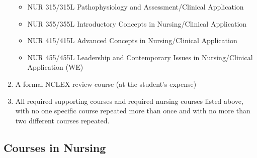 \documentclass[
  letterpaper,
]{scrbook}
\providecommand{\tightlist}{%
  \setlength{\itemsep}{0pt}\setlength{\parskip}{0pt}}
\begin{document}
\begin{enumerate}
  \begin{itemize}
  \tightlist
  \item
    NUR 315/315L Pathophysiology and Assessment/Clinical Application
  \item
    NUR 355/355L Introductory Concepts in Nursing/Clinical Application
  \item
    NUR 415/415L Advanced Concepts in Nursing/Clinical Application
  \item
    NUR 455/455L Leadership and Contemporary Issues in Nursing/Clinical
    Application (WE)
  \end{itemize}
\item
  A formal NCLEX review course (at the student's expense)
\item
  All required supporting courses and required nursing courses listed
  above, with no one specific course repeated more than once and with no
  more than two different courses repeated.
\end{enumerate}

\subsection{Courses in Nursing}\label{courses-in-nursing}
\end{document}
